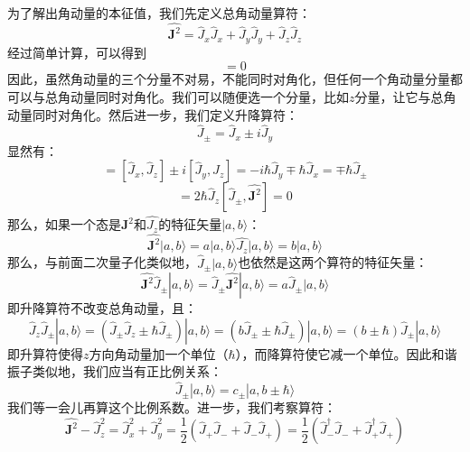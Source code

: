 \documentclass{ctexart}
\begin{document}
为了解出角动量的本征值，我们先定义总角动量算符：
\begin{equation}
\hat{\bm{J}^2}=\hat{J}_x\hat{J}_x+\hat{J}_y\hat{J}_y+\hat{J}_z\hat{J}_z
\end{equation}
经过简单计算，可以得到
\begin{equation}
[\hat{\bm{J}^2},\hat{J}_i]=0
\end{equation}
因此，虽然角动量的三个分量不对易，不能同时对角化，但任何一个角动量分量都可以与总角动量同时对角化。我们可以随便选一个分量，比如$z$分量，让它与总角动量同时对角化。然后进一步，我们定义升降算符：
\begin{equation}
\hat{J}_\pm=\hat{J}_x\pm i\hat{J}_y
\end{equation}
显然有：
\begin{equation}
[\hat{J}_\pm,\hat{J}_z]=[\hat{J}_x,\hat{J}_z]\pm i[\hat{J}_y,\hat{J}_z]=-i\hbar\hat{J}_y\mp\hbar\hat{J}_x=\mp\hbar\hat{J}_\pm
\end{equation}
\begin{equation}
[\hat{J}_+,\hat{J}_-]=2\hbar\hat{J}_z[\hat{J}_\pm,\hat{\bm{J}^2}]=0
\end{equation}
那么，如果一个态是$\hat{\bm{J}^2}$和$\hat{J_z}$的特征矢量$|a,b\rangle$：
\begin{equation}
\hat{\bm{J}^2}|a,b\rangle=a|a,b\rangle\hat{J_z}|a,b\rangle=b|a,b\rangle
\end{equation}
那么，与前面二次量子化类似地，$\hat{J}_\pm|a,b\rangle$也依然是这两个算符的特征矢量：
\begin{equation}
\hat{\bm{J}^2}\hat{J}_\pm|a,b\rangle=\hat{J}_\pm\hat{\bm{J}^2}|a,b\rangle=a\hat{J}_\pm|a,b\rangle
\end{equation}
即升降算符不改变总角动量，且：
\begin{equation}
\hat{J}_z\hat{J}_\pm|a,b\rangle=(\hat{J}_\pm\hat{J}_z\pm\hbar\hat{J}_\pm)|a,b\rangle=(b\hat{J}_\pm\pm\hbar\hat{J}_\pm)|a,b\rangle=(b\pm\hbar)\hat{J}_\pm|a,b\rangle
\end{equation}
即升算符使得$z$方向角动量加一个单位（$\hbar$），而降算符使它减一个单位。因此和谐振子类似地，我们应当有正比例关系：
\begin{equation}
\hat{J}_\pm|a,b\rangle=c_\pm|a,b\pm\hbar\rangle
\end{equation}
我们等一会儿再算这个比例系数。进一步，我们考察算符：
\begin{equation}
\hat{\bm{J}^2}-\hat{J}_z^2=\hat{J}_x^2+\hat{J}_y^2=\frac{1}{2}(\hat{J}_+\hat{J}_-+\hat{J}_-\hat{J}_+)=\frac{1}{2}(\hat{J}_-^\dagger\hat{J}_-+\hat{J}_+^\dagger\hat{J}_+)
\end{equation}
\end{document}
